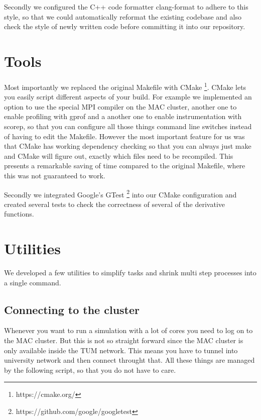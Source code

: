 Secondly we configured the C++ code formatter clang-format to adhere to this
style, so that we could automatically reformat the existing codebase and also
check the style of newly written code before committing it into our repository.

\section{Tools}

Most importantly we replaced the original Makefile with CMake
\footnote{https://cmake.org/}. CMake lets you easily script different aspects of
your build. For example we implemented an option to use the special MPI compiler
on the MAC cluster, another one to enable profiling with gprof and a another one
to enable instrumentation with scorep, so that you can configure all those
things command line switches instead of having to edit the Makefile. However the
most important feature for us was that CMake has working dependency checking so
that you can always just make and CMake will figure out, exactly which files
need to be recompiled. This presents a remarkable saving of time compared to the
original Makefile, where this was not guaranteed to work.

Secondly we integrated Google's GTest
\footnote{https://github.com/google/googletest} into our CMake configuration and
created several tests to check the correctness of several of the derivative
functions.

\section{Utilities}

We developed a few utilities to simplify tasks and shrink multi step processes
into a single command.

\subsection{Connecting to the cluster}

Whenever you want to run a simulation with a lot of cores you need to log on to
the MAC cluster. But this is not so straight forward since the MAC cluster is
only available inside the TUM network. This means you have to tunnel into
university network and then connect throught that. All these things are managed
by the following script, so that you do not have to care.


